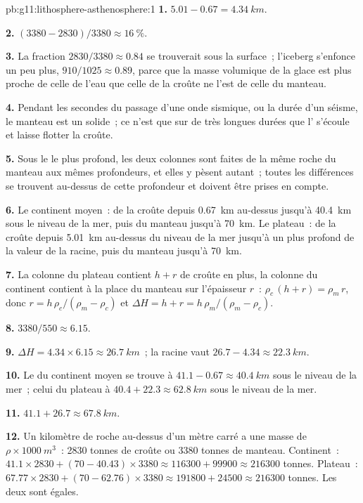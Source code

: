 \begin{solution}{pb:g11:lithosphere-asthenosphere:1}
\textbf{1.} $5.01 - 0.67 = \qty{4.34}{km}$.

\textbf{2.} $(3380 - 2830)/3380 \approx \qty{16}{\percent}$.

\textbf{3.} La fraction $2830/3380 \approx 0.84$ se trouverait sous la
surface~; l'iceberg s'enfonce un peu plus, $910/1025 \approx 0.89$, parce que
la masse volumique de la glace est plus proche de celle de l'eau que celle
de la croûte ne l'est de celle du manteau.

\textbf{4.} Pendant les secondes du passage d'une onde sismique, ou la durée
d'un séisme, le manteau est un solide~; ce n'est que sur de très longues
durées que l' s'écoule et laisse flotter la croûte.

\textbf{5.} Sous le  le plus profond, les deux colonnes sont faites de
la même roche du manteau aux mêmes profondeurs, et elles y pèsent autant~;
toutes les différences se trouvent au-dessus de cette profondeur et doivent
être prises en compte.

\textbf{6.} Le continent moyen~: de la croûte depuis \qty{0.67}{km}
au-dessus jusqu'à \qty{40.4}{km} sous le niveau de la mer, puis du manteau
jusqu'à \qty{70}{km}. Le plateau~: de la croûte depuis \qty{5.01}{km}
au-dessus du niveau de la mer jusqu'à un  plus profond de la valeur de
la racine, puis du manteau jusqu'à \qty{70}{km}.

\textbf{7.} La colonne du plateau contient $h + r$ de croûte en plus, la
colonne du continent contient à la place du manteau sur l'épaisseur $r$~:
$\rho_c\,(h + r) = \rho_m\,r$,
donc $r = h\,\rho_c/(\rho_m - \rho_c)$ et $\Delta H = h + r =
h\,\rho_m/(\rho_m - \rho_c)$.

\textbf{8.} $3380/550 \approx 6.15$.

\textbf{9.} $\Delta H = 4.34 \times 6.15 \approx \qty{26.7}{km}$~; la racine
vaut $26.7 - 4.34 \approx \qty{22.3}{km}$.

\textbf{10.} Le  du continent moyen se trouve à $41.1 - 0.67 \approx
\qty{40.4}{km}$ sous le niveau de la mer~; celui du plateau à $40.4 + 22.3 \approx
\qty{62.8}{km}$ sous le niveau de la mer.

\textbf{11.} $41.1 + 26.7 \approx \qty{67.8}{km}$.

\textbf{12.} Un kilomètre de roche au-dessus d'un mètre carré a une masse de
$\rho \times \qty{1000}{m^3}$~: \num{2830} tonnes de croûte ou \num{3380}
tonnes de manteau. Continent~: $41.1 \times 2830 + (70 - 40.43) \times 3380
\approx \num{116300} + \num{99900} \approx \num{216300}$ tonnes. Plateau~:
$67.77 \times 2830 + (70 - 62.76) \times 3380 \approx \num{191800} +
\num{24500} \approx \num{216300}$ tonnes. Les deux sont égales.


\end{solution}
